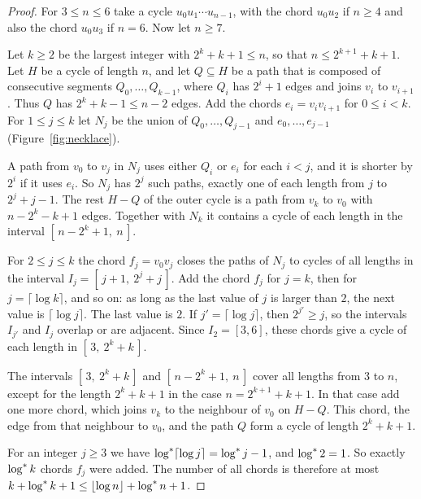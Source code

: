 \documentclass[11pt]{article}
\begin{document}
\begin{proof}
For $3\le n\le6$ take a cycle $u_0u_1\cdots u_{n-1}$, with the chord $u_0u_2$ if $n\ge4$ and also
the chord $u_0u_3$ if $n=6$. Now let $n\ge7$.

 Let $k\ge2$ be the largest integer with $2^{k}+k+1\le n$, so that
$n\le2^{k+1}+k+1$. Let $H$ be a cycle of length $n$, and let $Q\subseteq H$ be a path that is
composed of consecutive segments $Q_0,\dots,Q_{k-1}$, where $Q_i$ has $2^{i}+1$ edges and joins
$v_i$ to $v_{i+1}$. Thus $Q$ has $2^{k}+k-1\le n-2$ edges. Add the chords $e_i=v_iv_{i+1}$ for
$0\le i<k$. For $1\le j\le k$ let $N_j$ be the union of $Q_0,\dots,Q_{j-1}$ and
$e_0,\dots,e_{j-1}$ (Figure~\ref{fig:necklace}).

A path from $v_0$ to $v_j$ in $N_j$ uses either $Q_i$ or $e_i$ for each $i<j$, and it is shorter by
$2^{i}$ if it uses $e_i$. So $N_j$ has $2^{j}$ such paths, exactly one of each length from $j$ to
$2^{j}+j-1$. The rest $H-Q$ of the outer cycle is a path from $v_k$ to $v_0$ with $n-2^{k}-k+1$
edges. Together with $N_k$ it contains a cycle of each length in the interval
$[\,n-2^{k}+1,\ n\,]$.

 For $2\le j\le k$ the chord $f_j=v_0v_j$ closes the paths of $N_j$ to cycles
of all lengths in the interval $I_j=[\,j+1,\ 2^{j}+j\,]$. Add the chord $f_j$ for $j=k$, then for
$j=\lceil\log k\rceil$, and so on: as long as the last value of $j$ is larger than $2$, the next
value is $\lceil\log j\rceil$. The last value is $2$. If $j'=\lceil\log j\rceil$, then
$2^{j'}\ge j$, so the intervals $I_{j'}$ and $I_j$ overlap or are adjacent. Since $I_2=[3,6]$, these
chords give a cycle of each length in $[\,3,\ 2^{k}+k\,]$.

 The intervals $[\,3,\ 2^{k}+k\,]$ and $[\,n-2^{k}+1,\ n\,]$ cover all lengths
from $3$ to $n$, except for the length $2^{k}+k+1$ in the case $n=2^{k+1}+k+1$. In that case add
one more chord, which joins $v_k$ to the neighbour of $v_0$ on $H-Q$. This chord, the edge from that
neighbour to $v_0$, and the path $Q$ form a cycle of length $2^{k}+k+1$.

 For an integer $j\ge3$ we have $\log^{*}\lceil\log j\rceil=\log^{*} j-1$, and
$\log^{*}2=1$. So exactly $\log^{*} k$ chords $f_j$ were added. The number of all chords is therefore at
most $k+\log^{*} k+1\le\lfloor\log n\rfloor+\log^{*} n+1$.
\end{proof}
\end{document}
